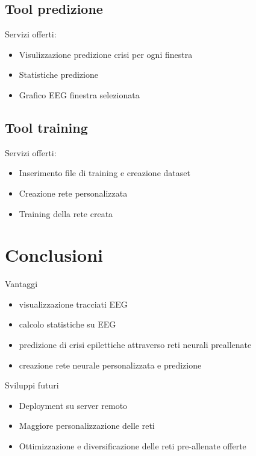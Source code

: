 \documentclass[xcolor=x11names,compress, 
					handout %
]{beamer}
\theoremstyle{definition} \newtheorem{esempio}{Esempio}
\theoremstyle{definition}
\begin{document}
	\subsection{Tool predizione}
		\begin{frame}{\subsecname}
			Servizi offerti:
			\begin{itemize}
				\item Visulizzazione predizione crisi per ogni finestra
				\item Statistiche predizione
				\item Grafico EEG finestra selezionata 
			\end{itemize}
		\end{frame}
	
	\subsection{Tool training}
		\begin{frame}{\subsecname}
			Servizi offerti:
			\begin{itemize}
				\item Inserimento file di training e creazione dataset
				\item Creazione rete personalizzata
				\item Training della rete creata
			\end{itemize}
		\end{frame}
		
		



\section*{Conclusioni}
	\begin{frame}{Vantaggi}
		\begin{itemize}
			\item visualizzazione tracciati EEG
			\item calcolo statistiche su EEG
			\item predizione di crisi epilettiche attraverso reti neurali preallenate
			\item creazione rete neurale personalizzata e predizione
		\end{itemize}
	\end{frame}

	\begin{frame}{Sviluppi futuri}
		\begin{itemize}
			\item Deployment su server remoto\pause
			\item Maggiore personalizzazione delle reti \pause
			\item Ottimizzazione e diversificazione delle reti pre-allenate offerte
		\end{itemize}
	\end{frame}
	
\end{document}
